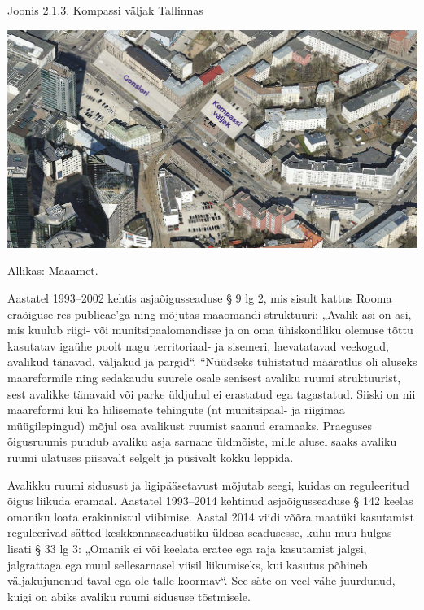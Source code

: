 \documentclass[estonian,]{article}
\begin{document}
{Joonis 2.1.3.} Kompassi väljak Tallinnas

\begin{center}\includegraphics[width=0.9\linewidth]{figures/2-chapter/fig213} \end{center}

\begin{imgsource}
{Allikas:} Maaamet.
\end{imgsource}

Aastatel 1993--2002 kehtis asjaõigusseaduse § 9 lg 2, mis sisult kattus Rooma eraõiguse res publicae'ga ning mõjutas maaomandi struktuuri: „Avalik asi on asi, mis kuulub riigi- või munitsipaalomandisse ja on oma ühiskondliku olemuse tõttu kasutatav igaühe poolt nagu territoriaal- ja sisemeri, laevatatavad veekogud, avalikud tänavad, väljakud ja pargid``. ``Nüüdseks tühistatud määratlus oli aluseks maareformile ning sedakaudu suurele osale senisest avaliku ruumi struktuurist, sest avalikke tänavaid või parke üldjuhul ei erastatud ega tagastatud. Siiski on nii maareformi kui ka hilisemate tehingute (nt munitsipaal- ja riigimaa müügilepingud) mõjul osa avalikust ruumist saanud eramaaks. Praeguses õigusruumis puudub avaliku asja sarnane üldmõiste, mille alusel saaks avaliku ruumi ulatuses piisavalt selgelt ja püsivalt kokku leppida.

Avalikku ruumi sidusust ja ligipääsetavust mõjutab seegi, kuidas on reguleeritud õigus liikuda eramaal. Aastatel 1993--2014 kehtinud asjaõigusseaduse § 142 keelas omaniku loata erakinnistul viibimise. Aastal 2014 viidi võõra maatüki kasutamist reguleerivad sätted keskkonnaseadustiku üldosa seadusesse, kuhu muu hulgas lisati § 33 lg 3: „Omanik ei või keelata eratee ega raja kasutamist jalgsi, jalgrattaga ega muul sellesarnasel viisil liikumiseks, kui kasutus põhineb väljakujunenud taval ega ole talle koormav``. See säte on veel vähe juurdunud, kuigi on abiks avaliku ruumi sidususe tõstmisele.
\end{document}

